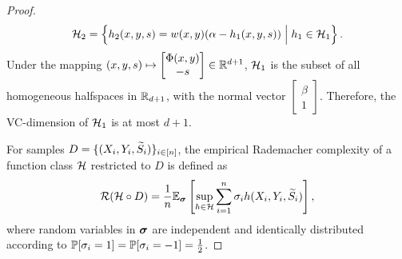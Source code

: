 \begin{proof}
\begin{align*}
    {\cal H}_2 &= \left\{ h_2(x,y,s) = w(x,y)(\alpha - h_1(x,y,s)) \Bigm| h_1 \in {\cal H}_1 \right\}. \\
\end{align*}
Under the mapping $(x,y,s) \mapsto 
\begin{bmatrix}
    \Phi(x,y) \\
    -s
\end{bmatrix} \in \mathbb{R}^{d+1}$,
${\cal H}_1$ is the subset of all homogeneous halfspaces in $\mathbb{R}_{d+1}$, with the normal vector $\begin{bmatrix}
    \beta \\
    1
\end{bmatrix}$. Therefore, the VC-dimension of ${\cal H}_1$ is at most $d+1$. 

For samples $D = \{(X_i,Y_i, {\widetilde{S}}_i)\}_{i\in [n]}$, the empirical Rademacher complexity of a function class ${\cal H}$ restricted to $D$ is defined as
\begin{align*}
    {\cal R}({\cal H} \circ D) =\frac{1}{n} \mathbb{E}_{\boldsymbol{\sigma}}\left[ \sup_{h\in{\cal H}} \sum_{i=1}^n \sigma_i h(X_i,Y_i,{\widetilde{S}}_i) \right],
\end{align*}
where random variables in $\boldsymbol{\sigma}$ are independent and identically distributed according to $\mathbb{P}[\sigma_i=1] = \mathbb{P}[\sigma_i=-1] = \frac{1}{2}$.


\end{proof}
